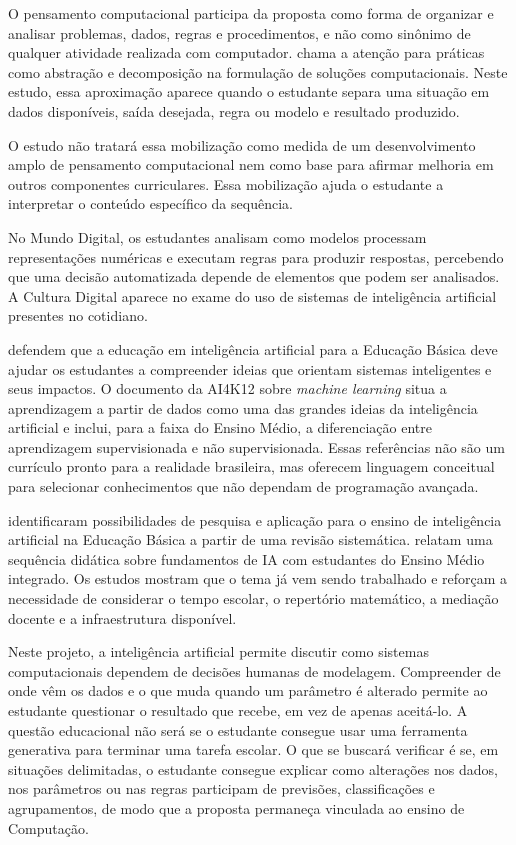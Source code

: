 O pensamento computacional participa da proposta como forma de organizar e analisar problemas, dados, regras e procedimentos, e não como sinônimo de qualquer atividade realizada com computador.  chama a atenção para práticas como abstração e decomposição na formulação de soluções computacionais. Neste estudo, essa aproximação aparece quando o estudante separa uma situação em dados disponíveis, saída desejada, regra ou modelo e resultado produzido.

O estudo não tratará essa mobilização como medida de um desenvolvimento amplo de pensamento computacional nem como base para afirmar melhoria em outros componentes curriculares. Essa mobilização ajuda o estudante a interpretar o conteúdo específico da sequência.

No Mundo Digital, os estudantes analisam como modelos processam representações numéricas e executam regras para produzir respostas, percebendo que uma decisão automatizada depende de elementos que podem ser analisados. A Cultura Digital aparece no exame do uso de sistemas de inteligência artificial presentes no cotidiano.

 defendem que a educação em inteligência artificial para a Educação Básica deve ajudar os estudantes a compreender ideias que orientam sistemas inteligentes e seus impactos. O documento da AI4K12 sobre \textit{machine learning} \cite{touretzky2023machine} situa a aprendizagem a partir de dados como uma das grandes ideias da inteligência artificial e inclui, para a faixa do Ensino Médio, a diferenciação entre aprendizagem supervisionada e não supervisionada. Essas referências não são um currículo pronto para a realidade brasileira, mas oferecem linguagem conceitual para selecionar conhecimentos que não dependam de programação avançada.

 identificaram possibilidades de pesquisa e aplicação para o ensino de inteligência artificial na Educação Básica a partir de uma revisão sistemática.  relatam uma sequência didática sobre fundamentos de IA com estudantes do Ensino Médio integrado. Os estudos mostram que o tema já vem sendo trabalhado e reforçam a necessidade de considerar o tempo escolar, o repertório matemático, a mediação docente e a infraestrutura disponível.

Neste projeto, a inteligência artificial permite discutir como sistemas computacionais dependem de decisões humanas de modelagem. Compreender de onde vêm os dados e o que muda quando um parâmetro é alterado permite ao estudante questionar o resultado que recebe, em vez de apenas aceitá-lo. A questão educacional não será se o estudante consegue usar uma ferramenta generativa para terminar uma tarefa escolar. O que se buscará verificar é se, em situações delimitadas, o estudante consegue explicar como alterações nos dados, nos parâmetros ou nas regras participam de previsões, classificações e agrupamentos, de modo que a proposta permaneça vinculada ao ensino de Computação.

